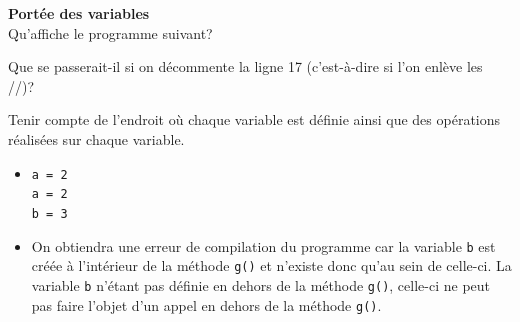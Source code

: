  \begin{Exercice}[10 minutes] [Java] \textbf{Portée des variables} \\
    Qu'affiche le programme suivant?
    
    Que se passerait-il si on décommente la ligne 17 (c'est-à-dire si l'on enlève les //)?

    \begin{conseil}
        Tenir compte de l'endroit où chaque variable est définie ainsi que des opérations réalisées sur chaque variable.
    \end{conseil}

    \begin{solution}
        \begin{itemize}
            \item  
            \lstinline{a = 2} \\
            \lstinline{a = 2} \\
            \lstinline{b = 3} \\ 

            \item On obtiendra une erreur de compilation du programme car la variable \lstinline{b} est créée à l'intérieur de la méthode \lstinline{g()} et n'existe donc qu'au sein de celle-ci. La variable \lstinline{b} n'étant pas définie en dehors de la méthode \lstinline{g()}, celle-ci ne peut pas faire l'objet d'un appel en dehors de la méthode \lstinline{g()}.
        \end{itemize}
        \end{solution}
 \end{Exercice}

